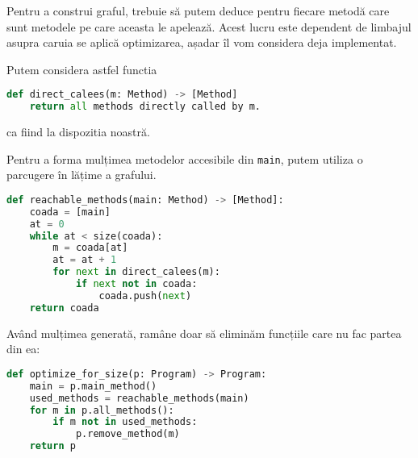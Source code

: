 Pentru a construi graful, trebuie să putem deduce pentru fiecare
metodă care sunt metodele pe care aceasta le apelează.
Acest lucru este dependent de limbajul asupra caruia se aplică
optimizarea, așadar îl vom considera deja implementat.

Putem considera astfel functia
\begin{lstlisting}[language=Python]
def direct_calees(m: Method) -> [Method]
    return all methods directly called by m.
\end{lstlisting}
ca fiind la dispozitia noastră.

Pentru a forma mulțimea metodelor accesibile din \texttt{main},
putem utiliza o parcugere în lățime a grafului.

\begin{lstlisting}[language=Python]
def reachable_methods(main: Method) -> [Method]:
    coada = [main]
    at = 0
    while at < size(coada):
        m = coada[at]
        at = at + 1
        for next in direct_calees(m):
            if next not in coada:
                coada.push(next)
    return coada
\end{lstlisting}

Având mulțimea generată, ramâne doar să eliminăm funcțiile
care nu fac partea din ea:

\begin{lstlisting}[language=Python]
def optimize_for_size(p: Program) -> Program:
    main = p.main_method()
    used_methods = reachable_methods(main)
    for m in p.all_methods():
        if m not in used_methods:
            p.remove_method(m)
    return p
\end{lstlisting}
